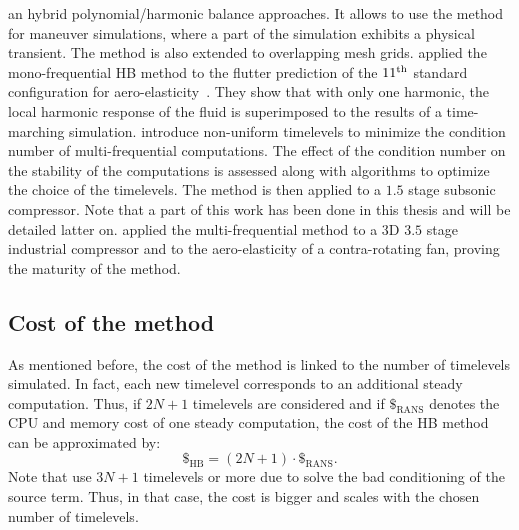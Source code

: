 an hybrid polynomial/harmonic balance approaches. 
It allows to use the method for maneuver simulations, 
where a part of the simulation exhibits a physical transient.
The method is also extended to overlapping mesh grids.
\citet{Huang2013} applied the mono-frequential
HB method to the flutter prediction of the 
$11\textsuperscript{th}$ 
standard configuration for aero-elasticity~\cite{Fransson1999}.
They show that with only one harmonic, the local
harmonic response of the fluid is superimposed
to the results of a time-marching simulation.
\citet{JGuedeney2013} introduce non-uniform 
timelevels to minimize the condition number of multi-frequential
computations. 
The effect of the condition number on the stability
of the computations is assessed along with algorithms
to optimize the choice of the timelevels.
The method is then applied
to a $1.5$ stage subsonic compressor.
Note that a part of this work has been done in this
thesis and will be detailed latter on.
\citet{JSicot2013} applied the multi-frequential 
method to a $3$D
$3.5$ stage industrial compressor and to the
aero-elasticity of a contra-rotating fan, proving
the maturity of the method.


\subsection{Cost of the method}
As mentioned before, the cost of the method is linked to
the number of timelevels simulated.
In fact, each new timelevel corresponds to an additional steady computation.
Thus, if $2N+1$ timelevels are considered and if $\mathdollar_{\text{RANS}}$ 
denotes the CPU and memory cost of
one steady computation, the cost of the HB method can be 
approximated by:
\begin{equation}
	\mathdollar_{\text{HB}} = (2N+1) \cdot \mathdollar_{\text{RANS}}.
\end{equation}
Note that \citet{Ekici2007,Ekici2008a} use $3N+1$
timelevels or more due to solve the bad conditioning of the
source term. Thus, in that
case, the cost is bigger and scales with the chosen number
of timelevels.